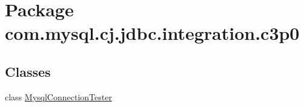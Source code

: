 \hypertarget{namespacecom_1_1mysql_1_1cj_1_1jdbc_1_1integration_1_1c3p0}{}\section{Package com.\+mysql.\+cj.\+jdbc.\+integration.\+c3p0}
\label{namespacecom_1_1mysql_1_1cj_1_1jdbc_1_1integration_1_1c3p0}
\subsection*{Classes}
\begin{DoxyCompactItemize}
\item 
class \mbox{\hyperlink{classcom_1_1mysql_1_1cj_1_1jdbc_1_1integration_1_1c3p0_1_1_mysql_connection_tester}{Mysql\+Connection\+Tester}}
\end{DoxyCompactItemize}
